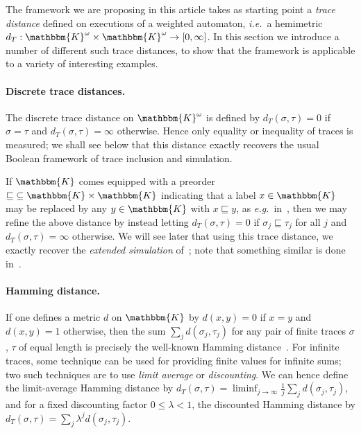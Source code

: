 \documentclass[copyright,creativecommons,sharealike]{eptcs}
\theoremstyle{plain}
\renewcommand*\K{\mathbbm{K}}
\newcommand*\ie{\textit{i.e.}}
\newcommand*\eg{\textit{e.g.}}
\begin{document}
The framework we are proposing in this article takes as starting point
a \emph{trace distance} defined on executions of a weighted automaton,
\ie~a hemimetric $d_T: \K^\omega\times \K^\omega\to[ 0, \infty]$.
In this section we introduce a number of different such trace
distances, to show that the framework is applicable to a variety of
interesting examples.

\paragraph{Discrete trace distances.}
\label{ex:lts}

The discrete trace distance on $\K^\omega$ is defined by $d_T( \sigma,
\tau)= 0$ if $\sigma= \tau$ and $d_T( \sigma, \tau)= \infty$
otherwise.  Hence only equality or inequality of traces is measured;
we shall see below that this distance exactly recovers the usual
Boolean framework of trace inclusion and simulation.

If $\K$ comes equipped with a preorder $\mathord\sqsubseteq\subseteq
\K\times \K$ indicating that a label $x\in \K$ may be replaced by any
$y\in \K$ with $x\sqsubseteq y$, as \eg~in~\cite{Thomsen87}, then we
may refine the above distance by instead letting $d_T( \sigma, \tau)=
0$ if $\sigma_j\sqsubseteq \tau_j$ for all $j$ and $d_T( \sigma,
\tau)= \infty$ otherwise.  We will see later that using this trace
distance, we exactly recover the \emph{extended simulation}
of~\cite{Thomsen87}; note that something similar is done
in~\cite{DBLP:journals/dke/MedeirosAW08}. 

\paragraph{Hamming distance.}

If one defines a metric $d$ on $\K$ by $d( x, y)= 0$ if $x= y$ and $d(
x, y)= 1$ otherwise, then the sum $\sum_j d( \sigma_j, \tau_j)$ for
any pair of finite traces $\sigma$, $\tau$ of equal length is
precisely the well-known Hamming distance~\cite{Hamming50}.  For
infinite traces, some technique can be used for providing finite
values for infinite sums; two such techniques are to use \emph{limit
  average} or \emph{discounting}.  We can hence define the
limit-average Hamming distance by $d_T( \sigma, \tau)= \liminf_{ j\to
  \infty} \frac1j \sum_j d( \sigma_j, \tau_j)$, and for a fixed
discounting factor $0\le \lambda< 1$, the discounted Hamming distance
by $d_T( \sigma, \tau)= \sum_j \lambda^j d( \sigma_j, \tau_j)$.
\end{document}
